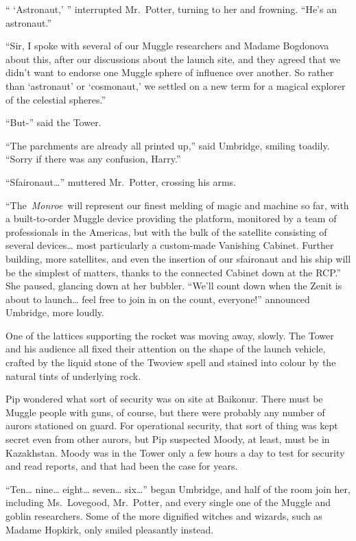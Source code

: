 `` `Astronaut,' '' interrupted Mr.~Potter, turning to her and frowning.
``He's an astronaut.''

``Sir, I spoke with several of our Muggle researchers and Madame
Bogdonova about this, after our discussions about the launch site, and
they agreed that we didn't want to endorse one Muggle sphere of
influence over another. So rather than `astronaut' or `cosmonaut,' we
settled on a new term for a magical explorer of the celestial spheres.''

``But-'' said the Tower.

``The parchments are already all printed up,'' said Umbridge, smiling
toadily. ``Sorry if there was any confusion, Harry.''

``Sfaironaut\ldots{}'' muttered Mr.~Potter, crossing his arms.

``The~\emph{Monroe}~will represent our finest melding of magic and
machine so far, with a built-to-order Muggle device providing the
platform, monitored by a team of professionals in the Americas, but with
the bulk of the satellite consisting of several devices\ldots{} most
particularly a custom-made Vanishing Cabinet. Further building, more
satellites, and even the insertion of our sfaironaut and his ship will
be the simplest of matters, thanks to the connected Cabinet down at the
RCP.'' She paused, glancing down at her bubbler. ``We'll count down when
the Zenit is about to launch\ldots{} feel free to join in on the count,
everyone!'' announced Umbridge, more loudly.

One of the lattices supporting the rocket was moving away, slowly. The
Tower and his audience all fixed their attention on the shape of the
launch vehicle, crafted by the liquid stone of the Twoview spell and
stained into colour by the natural tints of underlying rock.

Pip wondered what sort of security was on site at Baikonur. There must
be Muggle people with guns, of course, but there were probably any
number of aurors stationed on guard. For operational security, that sort
of thing was kept secret even from other aurors, but Pip suspected
Moody, at least, must be in Kazakhstan. Moody was in the Tower only a
few hours a day to test for security and read reports, and that had been
the case for years.

``Ten\ldots{} nine\ldots{} eight\ldots{} seven\ldots{} six\ldots{}''
began Umbridge, and half of the room join her, including Ms.~Lovegood,
Mr.~Potter, and every single one of the Muggle and goblin researchers.
Some of the more dignified witches and wizards, such as Madame Hopkirk,
only smiled pleasantly instead.

